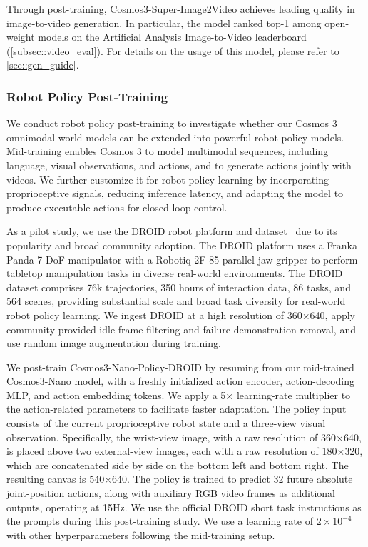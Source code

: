 \documentclass{llmxive}
\begin{document}
Through post-training, Cosmos3-Super-Image2Video achieves leading quality in image-to-video generation. In particular, the model ranked top-1 among open-weight models on the Artificial Analysis Image-to-Video leaderboard (\cref{subsec::video_eval}). For details on the usage of this model, please refer to \cref{sec::gen_guide}.


\subsubsection{Robot Policy Post-Training}
\label{sec::robot_policy_post_train}

We conduct robot policy post-training to investigate whether our Cosmos 3 omnimodal world models can be extended into powerful robot policy models. Mid-training enables Cosmos 3 to model multimodal sequences, including language, visual observations, and actions, and to generate actions jointly with videos. We further customize it for robot policy learning by incorporating proprioceptive signals, reducing inference latency, and adapting the model to produce executable actions for closed-loop control.

As a pilot study, we use the DROID robot platform and dataset~\citep{khazatsky2024droid} due to its popularity and broad community adoption. The DROID platform uses a Franka Panda 7-DoF manipulator with a Robotiq 2F-85 parallel-jaw gripper to perform tabletop manipulation tasks in diverse real-world environments. The DROID dataset comprises 76k trajectories, 350 hours of interaction data, 86 tasks, and 564 scenes, providing substantial scale and broad task diversity for real-world robot policy learning. We ingest DROID at a high resolution of 360$\times$640, apply community-provided idle-frame filtering and failure-demonstration removal, and use random image augmentation during training.

We post-train Cosmos3-Nano-Policy-DROID by resuming from our mid-trained Cosmos3-Nano model, with a freshly initialized action encoder, action-decoding MLP, and action embedding tokens. We apply a 5$\times$ learning-rate multiplier to the action-related parameters to facilitate faster adaptation. The policy input consists of the current proprioceptive robot state and a three-view visual observation. Specifically, the wrist-view image, with a raw resolution of 360$\times$640, is placed above two external-view images, each with a raw resolution of 180$\times$320, which are concatenated side by side on the bottom left and bottom right. The resulting canvas is 540$\times$640. The policy is trained to predict 32 future absolute joint-position actions, along with auxiliary RGB video frames as additional outputs, operating at 15Hz. We use the official DROID short task instructions as the prompts during this post-training study. We use a learning rate of $2 \times 10^{-4}$ with other hyperparameters following the mid-training setup.
\end{document}

